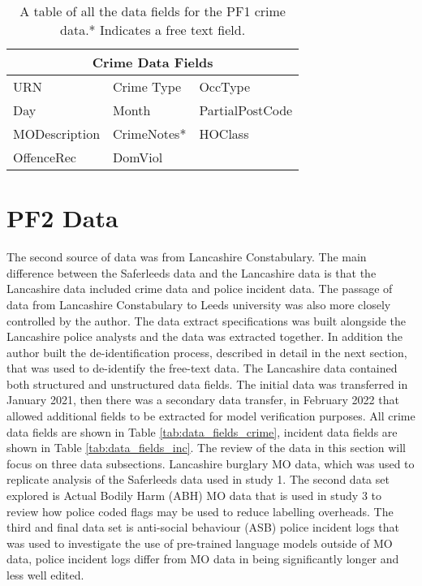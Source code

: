 \begin{table}[]
\centering
\begin{tabular}{@{}lll@{}}
\toprule
\multicolumn{3}{c}{Crime Data Fields}                          \\ \midrule
URN & Crime Type       & OccType      \\
Day           & Month          & PartialPostCode                \\
MODescription & CrimeNotes*             & HOClass            \\
OffenceRec  &  DomViol          &           \\ \bottomrule
\end{tabular}
\caption[Table of data fields for the PF1 data]{\label{tab:data_fields_saferleeds} A table of all the data fields for the PF1 crime data.* Indicates a free text field.}
\end{table}


\section{PF2 Data} The second source of data was from Lancashire Constabulary. The main difference between the Saferleeds data and the Lancashire data is that the Lancashire data included crime data and police incident data. The passage of data from Lancashire Constabulary to Leeds university was also more closely controlled by the author. The data extract specifications was built alongside the Lancashire police analysts and the data was extracted together. In addition the author built the de-identification process, described in detail in the next section, that was used to de-identify the free-text data. The Lancashire data contained both structured and unstructured data fields. The initial data was transferred in January 2021, then there was a secondary data transfer, in February 2022 that allowed additional fields to be extracted for model verification purposes. All crime data fields are shown in Table \ref{tab:data_fields_crime}, incident data fields are shown in Table \ref{tab:data_fields_inc}. The review of the data in this section will focus on three data subsections. Lancashire burglary MO data, which was used to replicate analysis of the Saferleeds data used in study 1. The second data set explored is Actual Bodily Harm (ABH) MO data that is used in study 3 to review how police coded flags may be used to reduce labelling overheads. The third and final data set is anti-social behaviour (ASB) police incident logs that was used to investigate the use of pre-trained language models outside of MO data, police incident logs differ from MO data in being significantly longer and less well edited.  


